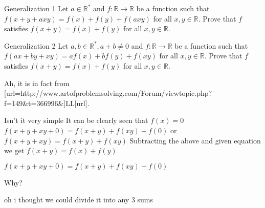 \begin{solution}
	Generalization 1
Let $a\in {{\mathbb{R}}^{*}}$ and $f:\mathbb{R}\to \mathbb{R}$ be a function such that $f(x+y+axy)=f(x)+f(y)+f(axy)$ for all $x, y\in\mathbb{R}$. Prove that $f$ satisfies $f(x+y)=f(x)+f(y)$ for all $x, y\in\mathbb{R}$.
\end{solution}



\begin{solution}
	Generalization 2
Let $a,b\in {{\mathbb{R}}^{*}},a+b\ne 0$ and $f:\mathbb{R}\to \mathbb{R}$ be a function such that $f(ax+by+xy)=af(x)+bf(y)+f(xy)$ for all $x, y\in\mathbb{R}$. Prove that $f$ satisfies $f(x+y)=f(x)+f(y)$ for all $x, y\in\mathbb{R}$.
\end{solution}



\begin{solution}
	Ah, it is in fact from [url=http://www.artofproblemsolving.com/Forum/viewtopic.php?f=149&t=366996&]LL[\/url].
\end{solution}



\begin{solution}
	Isn't it very simple
It can be clearly seen that $f(x)=0$
$f(x+y+xy+0)=f(x+y)+f(xy)+f(0)$
or $f(x+y+xy)=f(x+y)+f(xy)$
Subtracting the above and given equation
we get $f(x+y)=f(x)+f(y)$
\end{solution}



\begin{solution}
	\begin{tcolorbox}
$f(x+y+xy+0)=f(x+y)+f(xy)+f(0)$
\end{tcolorbox}

Why?


\end{solution}



\begin{solution}
	oh i thought we could divide it into any 3 sums
\end{solution}



